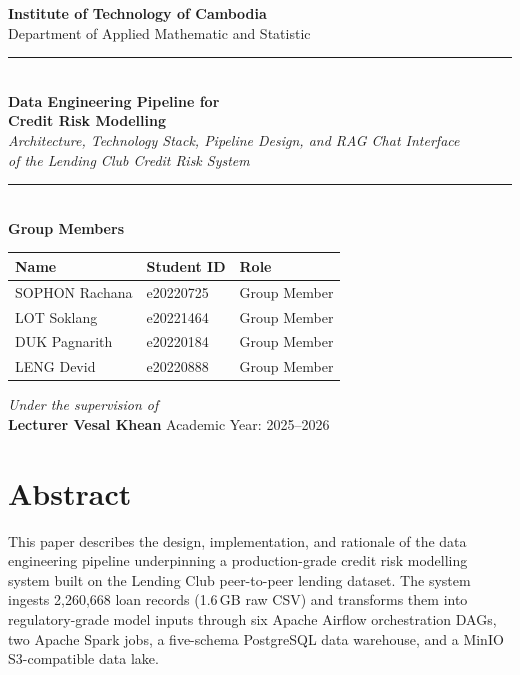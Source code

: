 \documentclass[12pt,a4paper]{report}
\begin{document}
\begin{titlepage}
\centering\vspace*{1cm}
{\LARGE\bfseries Institute of Technology of Cambodia}\\[0.5cm]
{\large Department of Applied Mathematic and Statistic}\\[2cm]
\rule{\textwidth}{1.5pt}\\[0.4cm]
{\Huge\bfseries Data Engineering Pipeline for\\[0.3cm] Credit Risk Modelling}\\[0.3cm]
{\Large\itshape Architecture, Technology Stack, Pipeline Design, and RAG Chat Interface\\
of the Lending Club Credit Risk System}\\[0.3cm]
\rule{\textwidth}{1.5pt}\\[2cm]
{\large\bfseries Group Members}\\[0.5cm]
\begin{tabular}{lll}
\toprule
\textbf{Name} & \textbf{Student ID} & \textbf{Role} \\
\midrule
SOPHON Rachana  & e20220725 & Group Member \\
LOT Soklang     & e20221464 & Group Member \\
DUK Pagnarith   & e20220184 & Group Member \\
LENG Devid      & e20220888 & Group Member \\
\bottomrule
\end{tabular}
\vspace{2cm}
{\large\itshape Under the supervision of}\\[0.4cm]
{\Large\bfseries Lecturer Vesal Khean}
\vfill
{\large Academic Year: 2025--2026}
\end{titlepage}

\chapter*{Abstract}

This paper describes the design, implementation, and rationale of the data engineering pipeline underpinning a production-grade credit risk modelling system built on the Lending Club peer-to-peer lending dataset. The system ingests 2,260,668 loan records (1.6\,GB raw CSV) and transforms them into regulatory-grade model inputs through six Apache Airflow orchestration DAGs, two Apache Spark jobs, a five-schema PostgreSQL data warehouse, and a MinIO S3-compatible data lake.
\end{document}
